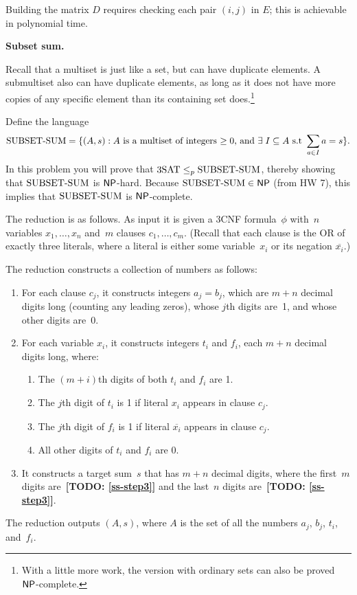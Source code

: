 \documentclass[11pt,addpoints, answers]{exam}
\begin{document}
\begin{questions}
\begin{solution}
Building the matrix \(D\) requires checking each pair \((i,j)\) in \(E\); this is achievable in polynomial time.
\end{solution}
  

  \question \textbf{Subset sum.} \nopagebreak

  Recall that a multiset is just like a set, but can have duplicate elements.
  A submultiset also can have duplicate elements, as long as it does not have more copies of any specific element than its containing set does.\footnote{With a little more work, the version with ordinary sets can also be proved $\mathsf{NP}$-complete.}

  Define the language
  \[ \text{SUBSET-SUM} = \{(A, s) : A \text{ is a multiset of integers $\geq 0$, and } \exists\; I \subseteq A \text{ s.t } \sum_{a \in I} a = s\}.
  \]
  In this problem you will prove that $\text{3SAT} \leq_p \text{SUBSET-SUM}$, thereby showing that $\text{SUBSET-SUM}$ is $\mathsf{NP}$-hard.
  Because $\text{SUBSET-SUM} \in\mathsf{NP}$ (from HW 7), this implies that $\text{SUBSET-SUM}$ is $\mathsf{NP}$-complete.

  The reduction is as follows.
  As input it is given a 3CNF formula~$\phi$ with~$n$ variables $x_1, \ldots, x_n$ and~$m$ clauses $c_1, \ldots, c_m$.
  (Recall that each clause is the OR of exactly three literals, where a literal is either some variable~$x_{i}$ or its negation $\overline{x_{i}}$.)

  The reduction constructs a collection of numbers as follows:

  \begin{enumerate}
  \item For each clause $c_j$, it constructs integers $a_j=b_j$, which are $m + n$ decimal digits long (counting any leading zeros), whose $j$th digits are~1, and whose other digits are~0.
  \item For each variable $x_i$, it constructs integers $t_i$ and $f_i$, each $m + n$ decimal digits long, where:
    \begin{enumerate}
    \item The $(m + i)$th digits of both $t_i$ and $f_i$ are 1.
    \item The $j$th digit of $t_i$ is 1 if literal $x_i$ appears
      in clause $c_j$.
    \item The $j$th digit of $f_i$ is 1 if literal $\overline{x_i}$
      appears in clause $c_j$.
    \item All other digits of $t_i$ and $f_i$ are 0.
    \end{enumerate}
  \item It constructs a target sum~$s$ that has $m + n$ decimal digits, where the first~$m$ digits are~\textbf{[TODO: \cref{ss-step3}]} and the last~$n$ digits are~\textbf{[TODO: \cref{ss-step3}]}. 
  \end{enumerate}
  The reduction outputs $(A,s)$, where $A$ is the set of all the numbers $a_{j}$, $b_{j}$, $t_{i}$, and~$f_{i}$.


\end{questions}
\end{document}
